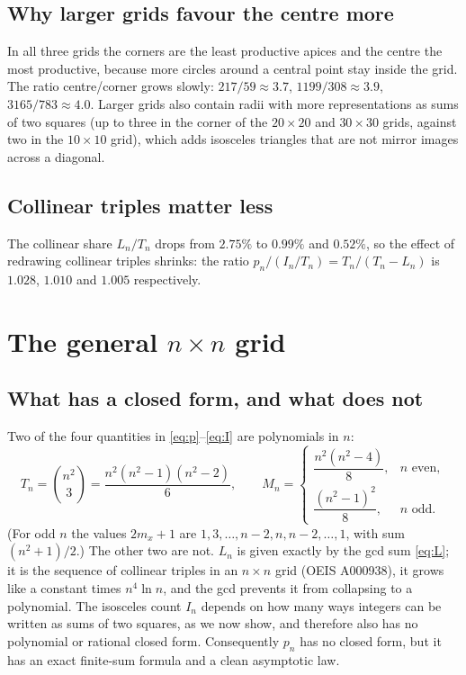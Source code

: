 \documentclass[11pt,a4paper]{article}
\theoremstyle{remark}
\begin{document}
\subsection{Why larger grids favour the centre more}

In all three grids the corners are the least productive apices and the centre
the most productive, because more circles around a central point stay inside
the grid. The ratio centre/corner grows slowly: $217/59\approx3.7$,
$1199/308\approx3.9$, $3165/783\approx4.0$. Larger grids also contain radii with
more representations as sums of two squares (up to three in the corner of the
$20\times20$ and $30\times30$ grids, against two in the $10\times10$ grid),
which adds isosceles triangles that are not mirror images across a diagonal.

\subsection{Collinear triples matter less}

The collinear share $L_n/T_n$ drops from $2.75\%$ to $0.99\%$ and $0.52\%$, so the
effect of redrawing collinear triples shrinks: the ratio $p_n/(I_n/T_n)=T_n/(T_n-L_n)$
is $1.028$, $1.010$ and $1.005$ respectively.

\section{The general $n\times n$ grid}\label{sec:general}

\subsection{What has a closed form, and what does not}

Two of the four quantities in \eqref{eq:p}--\eqref{eq:I} are polynomials in $n$:
\[
  T_n=\binom{n^2}{3}=\frac{n^2(n^2-1)(n^2-2)}{6},
  \qquad
  M_n=\begin{cases}
    \dfrac{n^2(n^2-4)}{8}, & n \text{ even},\\[1.5ex]
    \dfrac{(n^2-1)^2}{8}, & n \text{ odd}.
  \end{cases}
\]
(For odd $n$ the values $2m_x+1$ are $1,3,\dots,n-2,n,n-2,\dots,1$, with sum
$(n^2+1)/2$.) The other two are not. $L_n$ is given exactly by the gcd sum
\eqref{eq:L}; it is the sequence of collinear triples in an $n\times n$ grid
(OEIS A000938), it grows like a constant times $n^4\ln n$, and the gcd prevents it
from collapsing to a polynomial. The isosceles count $I_n$ depends on how many ways
integers can be written as sums of two squares, as we now show, and therefore also
has no polynomial or rational closed form. Consequently $p_n$ has no closed form,
but it has an exact finite-sum formula and a clean asymptotic law.
\end{document}
